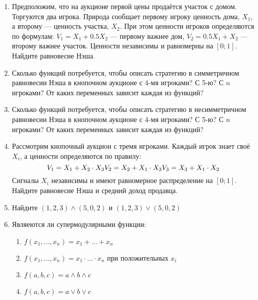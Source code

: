 \begin{enumerate}
\begin{enumerate}
\end{enumerate}

\item Предположим, что на аукционе первой цены продаётся участок с домом. Торгуются два игрока. Природа сообщает первому игроку ценность дома, $ X_{1} $, а второму — ценность участка, $ X_{2} $. При этом ценности игроков определяются по формулам: $ V_{1}=X_{1}+0.5X_{2} $ — первому важнее дом, $ V_{2}=0.5X_{1}+X_{2} $ — второму важнее участок. Ценности независимы и равномерны на $ [0;1] $. Найдите равновесие Нэша.

\item Сколько функций потребуется, чтобы описать стратегию в симметричном равновесии Нэша в кнопочном аукционе с 4-мя игроками? С 5-ю? С $ n $ игроками?  От каких переменных зависит каждая из функций?

\item Сколько функций потребуется, чтобы описать стратегию в несимметричном равновесии Нэша в кнопочном аукционе с 4-мя игроками? С 5-ю? С $ n $ игроками? От каких переменных зависит каждая из функций?

\item Рассмотрим кнопочный аукцион с тремя игроками. Каждый игрок знает своё $ X_{i} $, а ценности определяются по правилу:
\begin{equation}
V_{1}=X_{1}+X_{2}\cdot X_{3} \\
V_{2}=X_{2}+X_{1}\cdot X_{3} \\
V_{3}=X_{3}+X_{1}\cdot X_{2} \\
\end{equation}
Сигналы $ X_{i} $ независимы и имеют равномерное распределение на $ [0;1] $. Найдите равновесие Нэша и средний доход продавца.

\item Найдите $ (1,2,3)\wedge (5,0,2) $ и $ (1,2,3)\vee (5,0,2) $

\item Являеются ли супермодулярными функции:
\begin{enumerate}
\item $ f(x_{1},\ldots,x_{n})=x_{1}+\ldots+x_{n} $
\item $ f(x_{1},\ldots,x_{n})=x_{1}\cdot \ldots \cdot x_{n} $ при положительных $ x_{i} $
\item $ f(a,b,c)=a\wedge b\wedge c $
\item $ f(a,b,c)=a\vee b\vee c $
\end{enumerate}


\end{enumerate}
